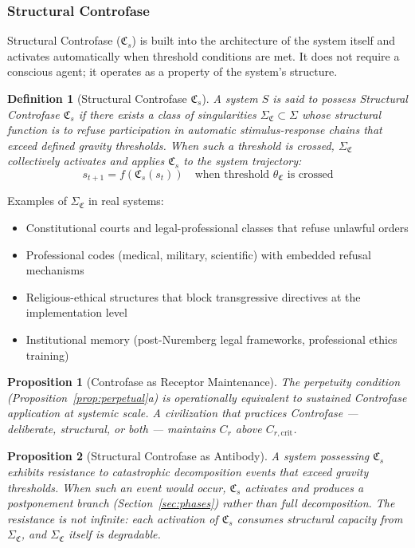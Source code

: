 \documentclass[12pt,a4paper]{article}
\newtheorem{definition}{Definition}[section]
\newtheorem{proposition}{Proposition}[section]
\newcommand{\reag}{C_r}
\newcommand{\reagcrit}{C_{r,\mathrm{crit}}}
\newcommand{\CFs}{\mathfrak{C}_s}        %
\newcommand{\SigmaCF}{\Sigma_{\mathfrak{C}}}  %
\newcommand{\thetaCF}{\theta_{\mathfrak{C}}}   %
\begin{document}
\subsubsection{Structural Controfase}

Structural Controfase ($\CFs$) is built into the architecture of the system itself and activates automatically when threshold conditions are met. It does not require a conscious agent; it operates as a property of the system's structure.

\begin{definition}[Structural Controfase $\CFs$]\label{def:cs}
A system $S$ is said to possess Structural Controfase $\CFs$ if there exists a class of singularities $\SigmaCF \subset \Sigma$ whose structural function is to refuse participation in automatic stimulus-response chains that exceed defined gravity thresholds. When such a threshold is crossed, $\SigmaCF$ collectively activates and applies $\CFs$ to the system trajectory:
\begin{equation}\label{eq:cs}
s_{t+1} = f(\CFs(s_t)) \quad \text{when threshold } \thetaCF \text{ is crossed}
\end{equation}
\end{definition}

Examples of $\SigmaCF$ in real systems:
\begin{itemize}[leftmargin=2em]
    \item Constitutional courts and legal-professional classes that refuse unlawful orders
    \item Professional codes (medical, military, scientific) with embedded refusal mechanisms
    \item Religious-ethical structures that block transgressive directives at the implementation level
    \item Institutional memory (post-Nuremberg legal frameworks, professional ethics training)
\end{itemize}

\begin{proposition}[Controfase as Receptor Maintenance]\label{prop:controfase_main}
The perpetuity condition (Proposition~\ref{prop:perpetual}a) is operationally equivalent to sustained Controfase application at systemic scale. A civilization that practices Controfase --- deliberate, structural, or both --- maintains $\reag$ above $\reagcrit$.
\end{proposition}

\begin{proposition}[Structural Controfase as Antibody]\label{prop:cs_antibody}
A system possessing $\CFs$ exhibits resistance to catastrophic decomposition events that exceed gravity thresholds. When such an event would occur, $\CFs$ activates and produces a postponement branch (Section~\ref{sec:phases}) rather than full decomposition. The resistance is not infinite: each activation of $\CFs$ consumes structural capacity from $\SigmaCF$, and $\SigmaCF$ itself is degradable.
\end{proposition}
\end{document}

